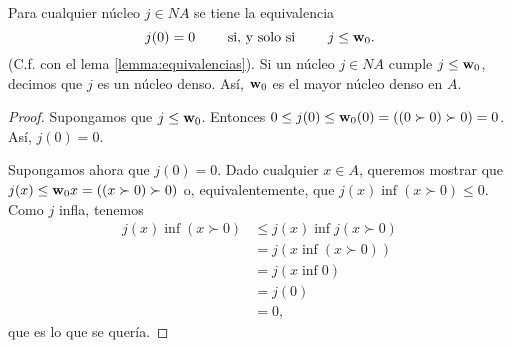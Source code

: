 \begin{lemma}%
  \label{lemma:nucleos-densos}
  Para cualquier núcleo $j\in NA$ se tiene la equivalencia
  \[
    j(0)=0 \qquad\text{ si, y solo si }\qquad j\leq \mathbf w_{0}
  .\]
  (C.f. con el lema \ref{lemma:equivalencias}).
  Si un núcleo $j\in NA$ cumple $j\leq\mathbf w_{0}$,
  decimos que $j$ es un núcleo denso.
  Así, $\mathbf w_{0}$ es el mayor núcleo denso en $A$.
\end{lemma}
\begin{proof}
    Supongamos que $j\leq \mathbf w_{0}$.
    Entonces $0\leq j(0)\leq \mathbf w_{0}(0)=((0\succ 0)\succ 0)=0$. Así, $j(0)=0$.

    Supongamos ahora que $j(0)=0$.
    Dado cualquier $x\in A$, queremos mostrar que $j(x)\leq\mathbf w_{0} x=((x\succ 0)\succ 0)$ o, equivalentemente, que
    $j(x)\inf(x\succ 0)\leq 0$.
    Como $j$ infla, tenemos
    \begin{align*}
      j(x)\inf(x\succ 0)
      &\leq j(x)\inf j(x\succ 0) \\
      &= j(x\inf (x\succ 0)) \\
      &= j(x\inf 0) \\
      &= j(0) \\
      &= 0,
    \end{align*}
    que es lo que se quería.
\end{proof}

